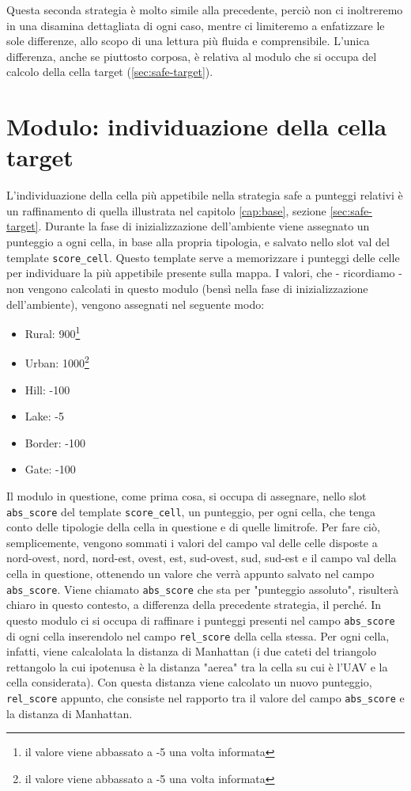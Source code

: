 Questa seconda strategia è molto simile alla precedente, perciò non ci inoltreremo in una disamina dettagliata di ogni caso, mentre ci limiteremo a enfatizzare le sole differenze, allo scopo di una lettura più fluida e comprensibile. L'unica differenza, anche se piuttosto corposa, è relativa al modulo che si occupa del calcolo della cella target (\ref{sec:safe-target}).

\section{Modulo: individuazione della cella target} \label{sec:rel-target}
L'individuazione della cella più appetibile nella strategia safe a punteggi relativi è un raffinamento di quella illustrata nel capitolo \ref{cap:base}, sezione \ref{sec:safe-target}. Durante la fase di inizializzazione dell'ambiente viene assegnato un punteggio a ogni cella, in base alla propria tipologia, e salvato nello slot val del template \texttt{score\_cell}. Questo template serve a memorizzare i punteggi delle celle per individuare la più appetibile presente sulla mappa. I valori, che - ricordiamo - non vengono calcolati in questo modulo (bensì nella fase di inizializzazione dell'ambiente), vengono assegnati nel seguente modo:
\begin{itemize}
	\item Rural: 900\footnote{il valore viene abbassato a -5 una volta informata}
	\item Urban: 1000\footnote{il valore viene abbassato a -5 una volta informata}
	\item Hill: -100
	\item Lake: -5
	\item Border: -100
	\item Gate: -100
\end{itemize}
Il modulo in questione, come prima cosa, si occupa di assegnare, nello slot \texttt{abs\_score} del template \texttt{score\_cell}, un punteggio, per ogni cella, che tenga conto delle tipologie della cella in questione e di quelle limitrofe. Per fare ciò, semplicemente, vengono sommati i valori del campo val delle celle disposte a nord-ovest, nord, nord-est, ovest, est, sud-ovest, sud, sud-est e il campo val della cella in questione, ottenendo un valore che verrà appunto salvato nel campo \texttt{abs\_score}. Viene chiamato \texttt{abs\_score} che sta per "punteggio assoluto", risulterà chiaro in questo contesto, a differenza della precedente strategia, il perché.
In questo modulo ci si occupa di raffinare i punteggi presenti nel campo \texttt{abs\_score} di ogni cella inserendolo nel campo \texttt{rel\_score} della cella stessa. Per ogni cella, infatti, viene calcalolata la distanza di Manhattan (i due cateti del triangolo rettangolo la cui ipotenusa è la distanza "aerea" tra la cella su cui è l'UAV e la cella considerata). Con questa distanza viene calcolato un nuovo punteggio, \texttt{rel\_score} appunto, che consiste nel rapporto tra il valore del campo \texttt{abs\_score} e la distanza di Manhattan.
